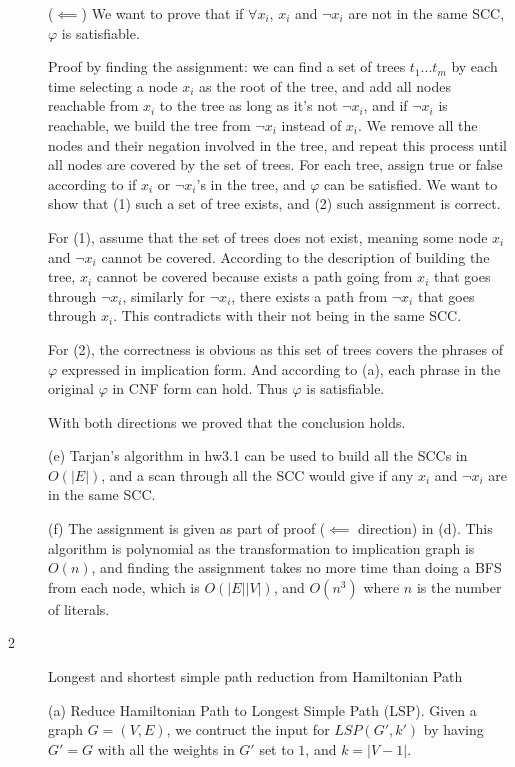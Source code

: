 \documentclass{article}
\begin{document}
\begin{description}
  ($\impliedby$) We want to prove that if $\forall x_i$, $x_i$ and $\neg x_i$ are not in the same SCC, $\varphi$ is satisfiable. 

  Proof by finding the assignment: we can find a set of trees $t_1...t_m$ by each time selecting a node $x_i$ as the root of the tree, and add all nodes reachable from $x_i$ to the tree as long as it's not $\neg x_i$, and if $\neg x_i$ is reachable, we build the tree from $\neg x_i$ instead of $x_i$. We remove all the nodes and their negation involved in the tree, and repeat this process until all nodes are covered by the set of trees. For each tree, assign true or false according to if $x_i$ or $\neg x_i$'s in the tree, and $\varphi$ can be satisfied. We want to show that (1) such a set of tree exists, and (2) such assignment is correct. 

  For (1), assume that the set of trees does not exist, meaning some node $x_i$ and $\neg x_i$ cannot be covered. According to the description of building the tree, $x_i$ cannot be covered because exists a path going from $x_i$ that goes through $\neg x_i$, similarly for $\neg x_i$, there exists a path from $\neg x_i$ that goes through $x_i$. This contradicts with their not being in the same SCC. 

  For (2), the correctness is obvious as this set of trees covers the phrases of $\varphi$ expressed in implication form. And according to (a), each phrase in the original $\varphi$ in CNF form can hold. Thus $\varphi$ is satisfiable.

  With both directions we proved that the conclusion holds.

  (e) Tarjan's algorithm in hw3.1 can be used to build all the SCCs in $O(|E|)$, and a scan through all the SCC would give if any $x_i$ and $\neg x_i$ are in the same SCC.

  (f) The assignment is given as part of proof ($\impliedby$ direction) in (d). This algorithm is polynomial as the transformation to implication graph is $O(n)$, and finding the assignment takes no more time than doing a BFS from each node, which is $O(|E||V|)$, and $O(n^3)$ where $n$ is the number of literals.

\item[2]{Longest and shortest simple path reduction from Hamiltonian Path}
  
  (a) Reduce Hamiltonian Path to Longest Simple Path (LSP). Given a graph $G = (V, E)$, we contruct the input for $LSP(G', k')$ by having $G' = G$ with all the weights in $G'$ set to $1$, and $k = |V - 1|$. 


\end{description}
\end{document}
